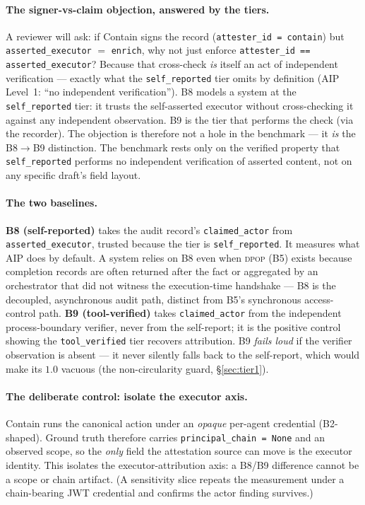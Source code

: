 \documentclass[11pt]{article}
\newcommand{\code}[1]{\texttt{#1}}
\newcommand{\dpop}{\textsc{dpop}}
\newcommand{\selfrep}{\code{self\_reported}}
\newcommand{\toolver}{\code{tool\_verified}}
\newcommand{\asexec}{\code{asserted\_executor}}
\begin{document}
\paragraph{The signer-vs-claim objection, answered by the tiers.}
A reviewer will ask: if Contain signs the record (\code{attester\_id =
contain}) but \asexec{} $=$ \code{enrich}, why not just enforce
\code{attester\_id == asserted\_executor}? Because that cross-check \emph{is}
itself an act of independent verification --- exactly what the \selfrep{} tier
omits by definition (AIP Level~1: ``no independent verification''). B8 models a
system at the \selfrep{} tier: it trusts the self-asserted executor without
cross-checking it against any independent observation. B9 is the tier that
performs the check (via the recorder). The objection is therefore not a hole in
the benchmark --- it \emph{is} the B8$\to$B9 distinction. The benchmark rests only
on the verified property that \selfrep{} performs no independent verification of
asserted content, not on any specific draft's field layout.

\paragraph{The two baselines.}
\textbf{B8 (self-reported)} takes the audit record's \code{claimed\_actor} from
\asexec{}, trusted because the tier is \selfrep{}. It measures what AIP does by
default. A system relies on B8 even when \dpop{} (B5) exists because completion
records are often returned after the fact or aggregated by an orchestrator that
did not witness the execution-time handshake --- B8 is the decoupled, asynchronous
audit path, distinct from B5's synchronous access-control path. \textbf{B9
(tool-verified)} takes \code{claimed\_actor} from the independent
process-boundary verifier, never from the self-report; it is the positive control
showing the \toolver{} tier recovers attribution. B9 \emph{fails loud} if the
verifier observation is absent --- it never silently falls back to the
self-report, which would make its $1.0$ vacuous (the non-circularity guard,
\S\ref{sec:tier1}).

\paragraph{The deliberate control: isolate the executor axis.}
Contain runs the canonical action under an \emph{opaque} per-agent credential
(B2-shaped). Ground truth therefore carries \code{principal\_chain = None} and an
observed scope, so the \emph{only} field the attestation source can move is the
executor identity. This isolates the executor-attribution axis: a B8/B9
difference cannot be a scope or chain artifact. (A sensitivity slice repeats the
measurement under a chain-bearing JWT credential and confirms the actor finding
survives.)
\end{document}
